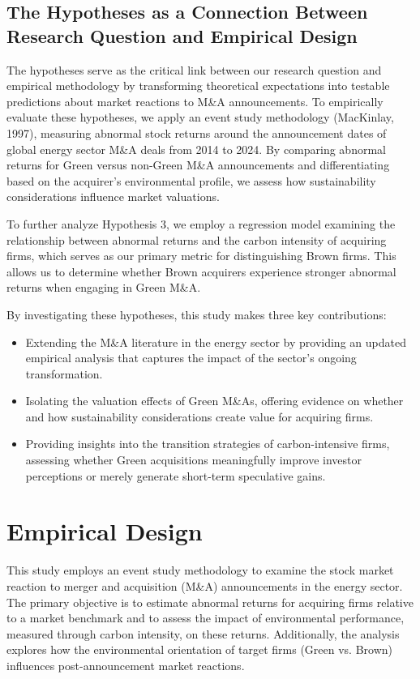 \documentclass[a4paper]{article}
\begin{document}
\subsection{The Hypotheses as a Connection Between Research Question and Empirical Design}
The hypotheses serve as the critical link between our research question and empirical methodology by transforming theoretical expectations into testable predictions about market reactions to M\&A announcements. To empirically evaluate these hypotheses, we apply an event study methodology (MacKinlay, 1997)\autocite{mackinlay1997}, measuring abnormal stock returns around the announcement dates of global energy sector M\&A deals from 2014 to 2024. By comparing abnormal returns for Green versus non-Green M\&A announcements and differentiating based on the acquirer's environmental profile, we assess how sustainability considerations influence market valuations.

To further analyze Hypothesis 3, we employ a regression model examining the relationship between abnormal returns and the carbon intensity of acquiring firms, which serves as our primary metric for distinguishing Brown firms. This allows us to determine whether Brown acquirers experience stronger abnormal returns when engaging in Green M\&A.

By investigating these hypotheses, this study makes three key contributions:
\begin{itemize}
    \setlength{\itemsep}{0pt} 
    \item Extending the M\&A literature in the energy sector by providing an updated empirical analysis that captures the impact of the sector's ongoing transformation.
    \item Isolating the valuation effects of Green M\&As, offering evidence on whether and how sustainability considerations create value for acquiring firms.
    \item Providing insights into the transition strategies of carbon-intensive firms, assessing whether Green acquisitions meaningfully improve investor perceptions or merely generate short-term speculative gains.
\end{itemize}


\section{Empirical Design}

This study employs an event study methodology to examine the stock market reaction to merger and acquisition (M\&A) announcements in the energy sector. The primary objective is to estimate abnormal returns for acquiring firms relative to a market benchmark and to assess the impact of environmental performance, measured through carbon intensity, on these returns. Additionally, the analysis explores how the environmental orientation of target firms (Green vs. Brown) influences post-announcement market reactions.
\end{document}
